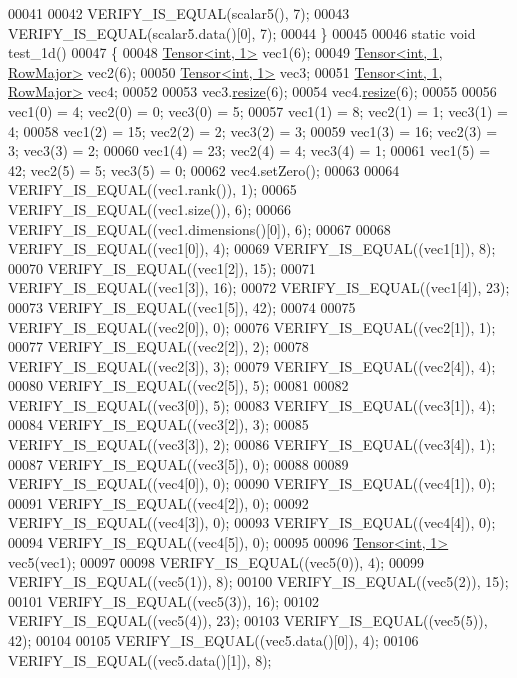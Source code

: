 \begin{DoxyCode}
00041 
00042   VERIFY\_IS\_EQUAL(scalar5(), 7);
00043   VERIFY\_IS\_EQUAL(scalar5.data()[0], 7);
00044 \}
00045 
00046 \textcolor{keyword}{static} \textcolor{keywordtype}{void} test\_1d()
00047 \{
00048   \hyperlink{class_eigen_1_1_tensor}{Tensor<int, 1>} vec1(6);
00049   \hyperlink{class_eigen_1_1_tensor}{Tensor<int, 1, RowMajor>} vec2(6);
00050   \hyperlink{class_eigen_1_1_tensor}{Tensor<int, 1>} vec3;
00051   \hyperlink{class_eigen_1_1_tensor}{Tensor<int, 1, RowMajor>} vec4;
00052 
00053   vec3.\hyperlink{class_eigen_1_1_tensor_a5ab1ec6dc9b05d5e4db3600bc9d2cc6b}{resize}(6);
00054   vec4.\hyperlink{class_eigen_1_1_tensor_a5ab1ec6dc9b05d5e4db3600bc9d2cc6b}{resize}(6);
00055 
00056   vec1(0) = 4;  vec2(0) = 0; vec3(0) = 5;
00057   vec1(1) = 8;  vec2(1) = 1; vec3(1) = 4;
00058   vec1(2) = 15; vec2(2) = 2; vec3(2) = 3;
00059   vec1(3) = 16; vec2(3) = 3; vec3(3) = 2;
00060   vec1(4) = 23; vec2(4) = 4; vec3(4) = 1;
00061   vec1(5) = 42; vec2(5) = 5; vec3(5) = 0;
00062   vec4.setZero();
00063 
00064   VERIFY\_IS\_EQUAL((vec1.rank()), 1);
00065   VERIFY\_IS\_EQUAL((vec1.size()), 6);
00066   VERIFY\_IS\_EQUAL((vec1.dimensions()[0]), 6);
00067 
00068   VERIFY\_IS\_EQUAL((vec1[0]), 4);
00069   VERIFY\_IS\_EQUAL((vec1[1]), 8);
00070   VERIFY\_IS\_EQUAL((vec1[2]), 15);
00071   VERIFY\_IS\_EQUAL((vec1[3]), 16);
00072   VERIFY\_IS\_EQUAL((vec1[4]), 23);
00073   VERIFY\_IS\_EQUAL((vec1[5]), 42);
00074 
00075   VERIFY\_IS\_EQUAL((vec2[0]), 0);
00076   VERIFY\_IS\_EQUAL((vec2[1]), 1);
00077   VERIFY\_IS\_EQUAL((vec2[2]), 2);
00078   VERIFY\_IS\_EQUAL((vec2[3]), 3);
00079   VERIFY\_IS\_EQUAL((vec2[4]), 4);
00080   VERIFY\_IS\_EQUAL((vec2[5]), 5);
00081 
00082   VERIFY\_IS\_EQUAL((vec3[0]), 5);
00083   VERIFY\_IS\_EQUAL((vec3[1]), 4);
00084   VERIFY\_IS\_EQUAL((vec3[2]), 3);
00085   VERIFY\_IS\_EQUAL((vec3[3]), 2);
00086   VERIFY\_IS\_EQUAL((vec3[4]), 1);
00087   VERIFY\_IS\_EQUAL((vec3[5]), 0);
00088 
00089   VERIFY\_IS\_EQUAL((vec4[0]), 0);
00090   VERIFY\_IS\_EQUAL((vec4[1]), 0);
00091   VERIFY\_IS\_EQUAL((vec4[2]), 0);
00092   VERIFY\_IS\_EQUAL((vec4[3]), 0);
00093   VERIFY\_IS\_EQUAL((vec4[4]), 0);
00094   VERIFY\_IS\_EQUAL((vec4[5]), 0);
00095 
00096   \hyperlink{class_eigen_1_1_tensor}{Tensor<int, 1>} vec5(vec1);
00097 
00098   VERIFY\_IS\_EQUAL((vec5(0)), 4);
00099   VERIFY\_IS\_EQUAL((vec5(1)), 8);
00100   VERIFY\_IS\_EQUAL((vec5(2)), 15);
00101   VERIFY\_IS\_EQUAL((vec5(3)), 16);
00102   VERIFY\_IS\_EQUAL((vec5(4)), 23);
00103   VERIFY\_IS\_EQUAL((vec5(5)), 42);
00104 
00105   VERIFY\_IS\_EQUAL((vec5.data()[0]), 4);
00106   VERIFY\_IS\_EQUAL((vec5.data()[1]), 8);

\end{DoxyCode}
